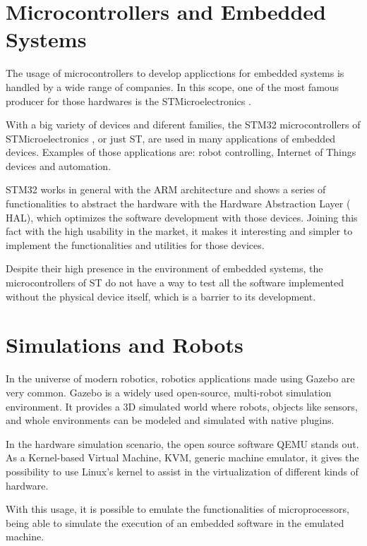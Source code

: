 \documentclass[../../monografia.tex]{subfiles}
\begin{document}
\section{Microcontrollers and Embedded Systems}

The usage of microcontrollers to develop applicctions for embedded systems is handled by a wide range of companies. In this scope, one of the most famous producer for those hardwares is the STMicroelectronics \cite{STMicroelectronics23}.

With a big variety of devices and diferent families, the STM32 microcontrollers of STMicroelectronics , or just ST, are used in many applications of embedded devices. Examples of those applications are: robot controlling, Internet of Things devices and automation.

STM32 works in general with the ARM architecture and shows a series of functionalities to abstract the hardware with the Hardware Abstraction Layer ( HAL), which optimizes the software development with those devices. Joining this fact with the high usability in the market, it makes it interesting and simpler to implement the functionalities and utilities for those devices.

Despite their high presence in the environment of embedded systems, the microcontrollers of ST do not have a way to test all the software implemented without the physical device itself, which is a barrier to its development.

\section{Simulations and Robots}

In the universe of modern robotics, robotics applications made using Gazebo are very common. Gazebo is a widely used open-source, multi-robot simulation environment. It provides a 3D simulated world where robots, objects like sensors, and whole environments can be modeled and simulated with native plugins.

In the hardware simulation scenario, the open source software QEMU stands out. As a Kernel-based Virtual Machine, KVM, generic machine emulator, it gives the possibility to use Linux’s kernel to assist in the virtualization of different kinds of hardware.

With this usage, it is possible to emulate the functionalities of microprocessors, being able to simulate the execution of an embedded software in the emulated machine.
\end{document}
